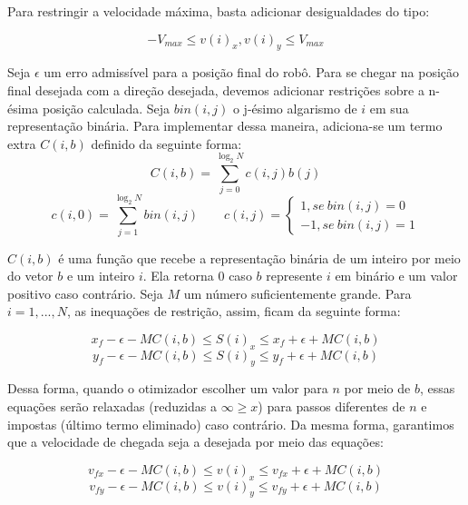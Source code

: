 \documentclass[a4paper,12pt]{article}
\begin{document}
Para restringir a velocidade máxima, basta adicionar desigualdades do tipo:

\begin{equation}
	-V_{max} \leq v(i)_x, v(i)_y \leq V_{max}
\end{equation}

Seja $\epsilon$ um erro admissível para a posição final do robô. Para se chegar na posição final desejada com a direção desejada, devemos adicionar restrições sobre a n-ésima posição calculada. Seja $bin(i,j)$ o j-ésimo algarismo de $i$ em sua representação binária. Para implementar dessa maneira, adiciona-se um termo extra $C(i,b)$ definido da seguinte forma:
\begin{equation}
    C(i,b) = \sum_{j=0}^{\log_2{N}} c(i,j)b(j)
\end{equation}
\begin{equation}
    c(i,0) = \sum_{j=1}^{\log_2 {N}} bin(i,j) \qquad
    c(i,j) = \left\{ \begin{array}{r} 1, se\ bin(i,j) = 0 \\ 
    -1, se\ bin(i,j) = 1
    \end{array} \right.
\end{equation}

$C(i,b)$ é uma função que recebe a representação binária de um inteiro por meio do vetor $b$ e um inteiro $i$. Ela retorna 0 caso $b$ represente $i$ em binário e um valor positivo caso contrário. Seja $M$ um número suficientemente grande. Para $i = 1,...,N$, as inequações de restrição, assim, ficam da seguinte forma:

\begin{equation}
	x_{f} - \epsilon - MC(i,b) \leq S(i)_x \leq x_{f} + \epsilon + MC(i,b)
\end{equation}
\begin{equation}
	y_{f} - \epsilon - MC(i,b) \leq S(i)_y \leq y_{f} + \epsilon + MC(i,b)
\end{equation}

Dessa forma, quando o otimizador escolher um valor para $n$ por meio de $b$, essas equações serão relaxadas (reduzidas a $\infty \geq x$) para passos diferentes de $n$ e impostas (último termo eliminado) caso contrário. Da mesma forma, garantimos que a velocidade de chegada seja a desejada por meio das equações:

\begin{equation}
	v_{fx} - \epsilon - MC(i,b) \leq v(i)_x \leq v_{fx} + \epsilon + MC(i,b)
\end{equation}
\begin{equation}
	v_{fy} - \epsilon - MC(i,b) \leq v(i)_y \leq v_{fy} + \epsilon + MC(i,b)
\end{equation}
\end{document}
